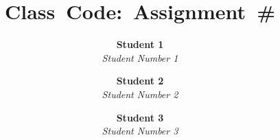 \newcommand{\hmwkTitle}{Assignment\ \#} %
\newcommand{\hmwkClass}{Class\ Code} %
\newcommand{\hmwkDueDate}{Due\ Date} %

\title{
    \vspace{2in}
    \textmd{\textbf{\hmwkClass:\ \hmwkTitle}}\\
    \vspace{3.in}
}

\newcommand{\hmwkAuthorNameOne}{Student 1}
\newcommand{\hmwkAuthorNumberOne}{Student Number 1}
\newcommand{\hmwkAuthorNameTwo}{Student 2}
\newcommand{\hmwkAuthorNumberTwo}{Student Number 2}
\newcommand{\hmwkAuthorNameThree}{Student 3}
\newcommand{\hmwkAuthorNumberThree}{Student Number 3}

\author{
    \textbf{\hmwkAuthorNameOne}\\
    \textit{\hmwkAuthorNumberOne}
    \and
    \textbf{\hmwkAuthorNameTwo}\\
    \textit{\hmwkAuthorNumberTwo}
    \and
    \textbf{\hmwkAuthorNameThree}\\
    \textit{\hmwkAuthorNumberThree}
}
